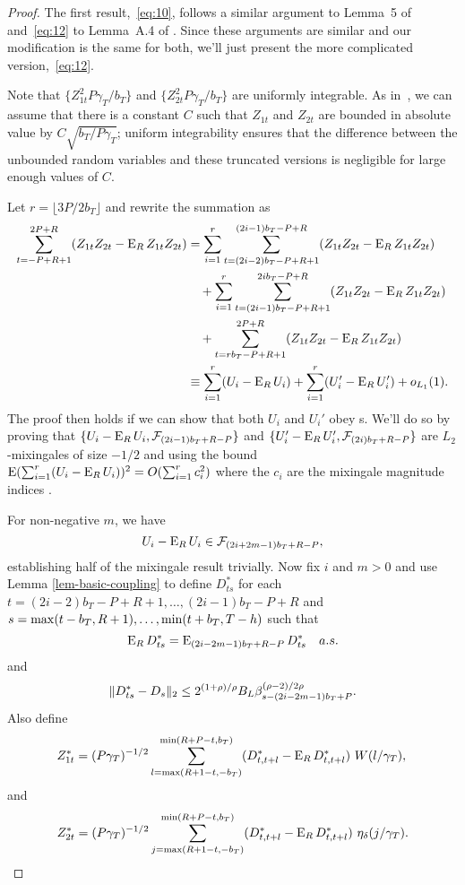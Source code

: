 \documentclass[11pt]{article}
\begin{document}
\begin{proof}
\newcommand{\UFiltration}[1]{\ensuremath{\mathcal{F}_{(#1)b_{T}+R-P}}}%
The first result,~\eqref{eq:10}, follows a similar argument to Lemma~5
of \citet{Jon:97} and~\eqref{eq:12} to Lemma~A.4 of \citet{JoD:00}.
Since these arguments are similar and our modification is the same for
both, we'll just present the more complicated version,~\eqref{eq:12}.

Note that $\{Z_{1t}^2 P\gamma_T/b_T\}$ and $\{Z_{2t}^2 P\gamma_T/b_T\}$
are uniformly integrable.  As in~\citet[Lemma A.4]{JoD:00}, we can
assume that there is a constant $C$ such that $Z_{1t}$ and $Z_{2t}$
are bounded in absolute value by $C\sqrt{b_T/P\gamma_T}$; uniform
integrability ensures that the difference between the unbounded random
variables and these truncated versions is negligible for large enough
values of $C$.

Let $r = \lfloor 3P/2b_T \rfloor$ and rewrite the summation as
\begin{align*}
  \sum_{t=-P+R+1}^{2P+R} (Z_{1t}Z_{2t} - \operatorname{E}_RZ_{1t}Z_{2t}) &= \sum_{i=1}^r \sum_{t=(2i-2)b_T-P+R+1}^{(2i-1)b_T-P+R} (Z_{1t}Z_{2t} - \operatorname{E}_RZ_{1t}Z_{2t}) \\
  &\quad+ \sum_{i=1}^r \sum_{t=(2i-1)b_T-P+R+1}^{2ib_T-P+R} (Z_{1t}Z_{2t} - \operatorname{E}_RZ_{1t}Z_{2t}) \\
  &\quad+ \sum_{t=r b_T - P + R + 1}^{2P+R} (Z_{1t}Z_{2t} - \operatorname{E}_RZ_{1t}Z_{2t}) \\
  &\equiv \sum_{i=1}^r (U_i - \operatorname{E}_R U_i) + \sum_{i=1}^r (U_i' - \operatorname{E}_R U_i') + o_{L_1}(1).
\end{align*}
The proof then holds if we can show that both $U_i$ and $U_i'$ obey
\lln s.  We'll do so by proving that $\{U_i -\E_R U_i,
\UFiltration{2i-1}\}$ and $\{U_i' - \E_R U_i', \UFiltration{2i}\}$ are
$L_2$-mixingales of size $-1/2$ and using the bound $\operatorname{E}(\sum_{i=1}^r (U_i -
\operatorname{E}_R U_i))^2 = O(\sum_{i=1}^r c_i^2)$ where the $c_i$ are the mixingale
magnitude indices \citep{Mcl:75}.

For non-negative $m$, we have
\begin{equation*}
U_i - \E_R U_i \in \UFiltration{2i+2m-1},
\end{equation*}
establishing half of the mixingale result trivially.  Now fix $i$ and $m >
0$ and use Lemma \ref{lem-basic-coupling} to define $D_{ts}^*$
for each $t =(2i-2)b_T-P+R+1,\dots,(2i-1)b_T-P+R$ and $s =
\max(t-b_T,R+1),\dots,\min(t+b_T,T-h)$ such that
\begin{equation*}
 \operatorname{E}_R D_{ts}^* = \operatorname{E}_{(2i-2m-1)b_T+R-P} D_{ts}^* \quad a.s.
\end{equation*}
and
\begin{equation*}
  \lVert D_{ts}^* - D_s \rVert_2 \leq 2^{(1+\rho)/\rho} B_L \beta^{(\rho-2)/2\rho}_{s - (2i-2m-1)b_T+P}.
\end{equation*}
Also define
\begin{equation*}
  Z_{1t}^* = (P\gamma_T)^{-1/2} \sum_{l=\max(R+1-t,-b_T)}^{\min(R+P-t,b_T)}
  (D_{t,t+l}^* - \operatorname{E}_R D_{t,t+l}^*)\ W(l/\gamma_T), \\
\end{equation*}
and
\begin{equation*}
Z_{2t}^* = (P\gamma_T)^{-1/2} \sum_{j=\vttLower}^{\vttUpper}
    (D_{t,t+l}^* - \E_R D_{t,t+l}^*)\ \kernelB{j/\gamma_T}.
\end{equation*}


\end{proof}
\end{document}
